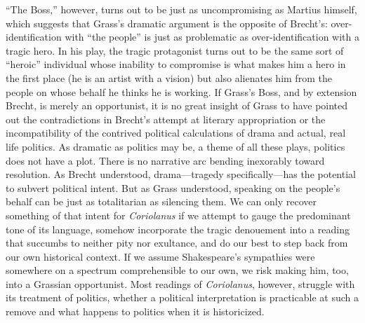 ``The Boss,'' however, turns out to be just as uncompromising as Martius himself, which suggests that Grass's dramatic argument is the opposite of Brecht's: over-identification with ``the people'' is just as problematic as over-identification with a tragic hero.
In his play, the tragic protagonist turns out to be the same sort of ``heroic'' individual whose inability to compromise is what makes him a hero in the first place (he is an artist with a vision) but also alienates him from the people on whose behalf he thinks he is working.
If Grass's Boss, and by extension Brecht, is merely an opportunist, it is no great insight of Grass to have pointed out the contradictions in Brecht's attempt at literary appropriation or the incompatibility of the contrived political calculations of drama and actual, real life politics.
As dramatic as politics may be, a theme of all these plays, politics does not have a plot.
There is no narrative arc bending inexorably toward resolution.
As Brecht understood, drama---tragedy specifically---has the potential to subvert political intent.
But as Grass understood, speaking on the people's behalf can be just as totalitarian as silencing them.
We can only recover something of that intent for \emph{Coriolanus} if we attempt to gauge the predominant tone of its language, somehow incorporate the tragic denouement into a reading that succumbs to neither pity nor exultance, and do our best to step back from our own historical context.
If we assume Shakespeare's sympathies were somewhere on a spectrum comprehensible to our own, we risk making him, too, into a Grassian opportunist.
Most readings of \emph{Coriolanus}, however, struggle with its treatment of politics, whether a political interpretation is practicable at such a remove and what happens to politics when it is historicized.

